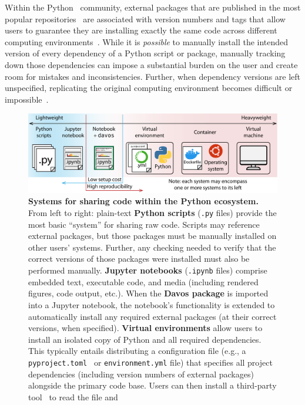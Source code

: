 \documentclass[preprint,12pt,a4paper]{elsarticle}
\begin{document}
Within the Python~\cite{vanR95} community, external packages that are
published in the most popular repositories~\cite{Pyth03, cond15} are
associated with version numbers and tags that allow users to guarantee
they are installing exactly the same code across different computing
environments~\cite{CoghStuf13}.  While it is \textit{possible} to
manually install the intended version of every dependency of a Python
script or package, manually tracking down those dependencies can
impose a substantial burden on the user and create room for mistakes
and inconsistencies. Further, when dependency versions are left
unspecified, replicating the original computing environment becomes
difficult or impossible~\citep{PimeEtal19}.

\begin{figure}[tp]
\centering
\includegraphics[width=\textwidth]{figs/shareable_code}
\caption{\small \textbf{Systems for sharing code within the Python
    ecosystem.}  From left to right: plain-text \textbf{Python
    scripts} (\texttt{.py} files) provide the most basic ``system''
  for sharing raw code.  Scripts may reference external packages, but
  those packages must be manually installed on other users' systems.
  Further, any checking needed to verify that the correct versions of
  those packages were installed must also be performed manually.
  \textbf{Jupyter notebooks} (\texttt{.ipynb} files) comprise embedded
  text, executable code, and media (including rendered figures, code
  output, etc.).  When the \textbf{Davos package} is imported
  into a Jupyter notebook, the notebook's functionality is extended to
  automatically install any required external packages (at their
  correct versions, when specified).  \textbf{Virtual environments}
  allow users to install an isolated copy of Python and all required
  dependencies. This typically entails distributing a configuration
  file (e.g., a \texttt{pyproject.toml}~\cite{CannEtal16} or
  \texttt{environment.yml} file) that specifies all project
  dependencies (including version numbers of external packages)
  alongside the primary code base. Users can then install a
  third-party tool~\cite[e.g.,][]{Anac12, Eust19} to read the file and
}
\end{figure}
\end{document}
